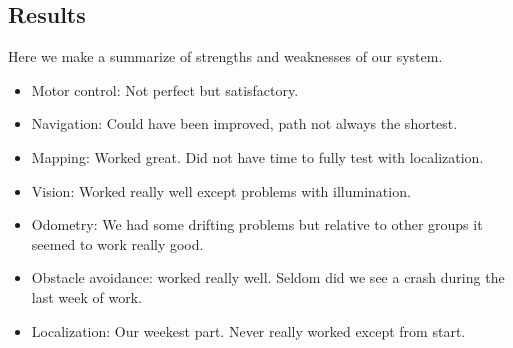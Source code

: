 \subsection{Results}

Here we make a summarize of strengths and weaknesses of our system.
\begin{itemize}
\item Motor control: Not perfect but satisfactory.
\item Navigation: Could have been improved, path not always the shortest.
\item Mapping: Worked great. Did not have time to fully test with localization.
\item Vision: Worked really well except problems with illumination.
\item Odometry: We had some drifting problems but relative to other groups it seemed to work really good.
\item Obstacle avoidance: worked really well. Seldom did we see a crash during the last week of work.
\item Localization: Our weekest part. Never really worked except from start. 
\end{itemize}